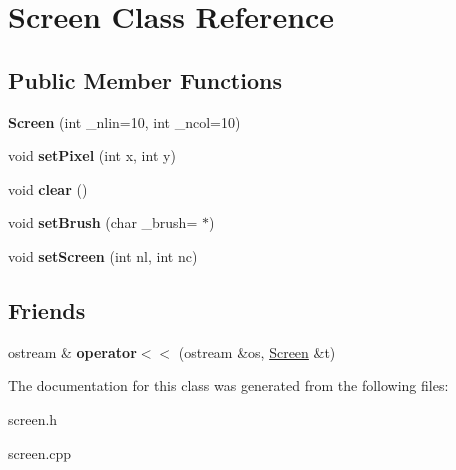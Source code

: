 \hypertarget{class_screen}{}\section{Screen Class Reference}
\label{class_screen}
\subsection*{Public Member Functions}
\begin{DoxyCompactItemize}
\item 
\mbox{\label{class_screen_a95aff497d133f685fbbb959d78dc0899}} 
{\bfseries Screen} (int \+\_\+nlin=10, int \+\_\+ncol=10)
\item 
\mbox{\label{class_screen_ae6bea81c57a22d226507c3c26fa95ee0}} 
void {\bfseries set\+Pixel} (int x, int y)
\item 
\mbox{\label{class_screen_a35e74266b2a04e37b354ceff7a5f1031}} 
void {\bfseries clear} ()
\item 
\mbox{\label{class_screen_a81a139ded3a626b9916d82209eb6673a}} 
void {\bfseries set\+Brush} (char \+\_\+brush=\textquotesingle{} $\ast$\textquotesingle{})
\item 
\mbox{\label{class_screen_a59f2c3f9e889b425940749e8f646db72}} 
void {\bfseries set\+Screen} (int nl, int nc)
\end{DoxyCompactItemize}
\subsection*{Friends}
\begin{DoxyCompactItemize}
\item 
\mbox{\label{class_screen_aab6a2880746bfe1b7964817cc8f0989e}} 
ostream \& {\bfseries operator$<$$<$} (ostream \&os, \hyperlink{class_screen}{Screen} \&t)
\end{DoxyCompactItemize}


The documentation for this class was generated from the following files\+:\begin{DoxyCompactItemize}
\item 
screen.\+h\item 
screen.\+cpp\end{DoxyCompactItemize}
